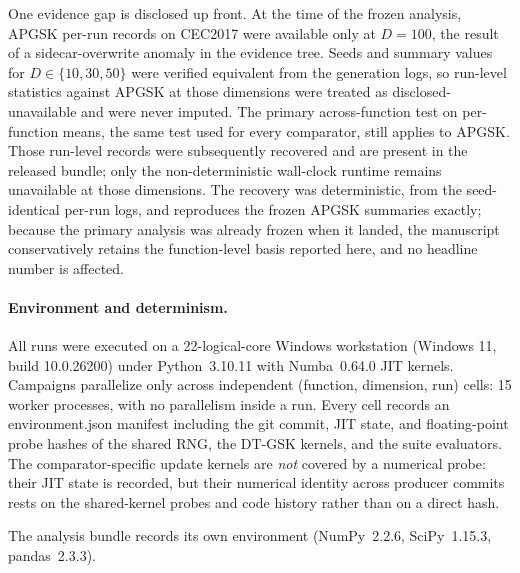 \documentclass[10pt,a4paper]{article}
\newcommand{\dtgsk}{DT-GSK}
\begin{document}
One evidence gap is disclosed up front. At the time of the frozen analysis,
APGSK per-run records on CEC2017 were available only at $D = 100$, the
result of a sidecar-overwrite anomaly in the evidence tree. Seeds and
summary values for $D \in \{10, 30, 50\}$ were verified equivalent from the
generation logs, so run-level statistics against APGSK at those dimensions
were treated as disclosed-unavailable and were never imputed. The primary
across-function test on per-function means, the same test used for every
comparator, still applies to APGSK. Those run-level records were
subsequently recovered and are present in the released bundle; only the
non-deterministic wall-clock runtime remains unavailable at those
dimensions. The recovery was deterministic, from the seed-identical per-run logs, and reproduces the frozen APGSK summaries exactly; because the primary analysis was already frozen when it landed, the manuscript conservatively retains the function-level basis reported here, and no headline number is affected.







\paragraph{Environment and determinism.}
All runs were executed on a 22-logical-core Windows workstation
(Windows 11, build 10.0.26200) under Python~3.10.11 with Numba~0.64.0
JIT kernels. Campaigns parallelize only across independent
(function, dimension, run) cells: 15 worker processes, with no parallelism
inside a run. Every cell records an environment.json
manifest including the git commit, JIT state, and floating-point
probe hashes of the shared RNG, the \dtgsk{} kernels, and the suite
evaluators. The comparator-specific update kernels are \emph{not} covered
by a numerical probe: their JIT state is recorded, but their numerical
identity across producer commits rests on the shared-kernel probes and code
history rather than on a direct hash.


The analysis bundle records its own environment (NumPy~2.2.6,
SciPy~1.15.3, pandas~2.3.3).
\end{document}
